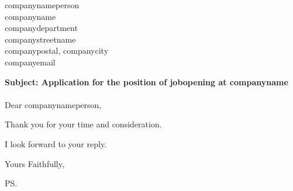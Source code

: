 \documentclass{letter}
\newcommand{\letterdate}{letterdate}
\newcommand{\jobopening}{jobopening}
\newcommand{\companynameperson}{companynameperson}
\newcommand{\companyname}{companyname}
\newcommand{\companydepartment}{companydepartment}
\newcommand{\companystreet}{companystreetname}
\newcommand{\companypostal}{companypostal}
\newcommand{\companycity}{companycity}
\newcommand{\companyemail}{companyemail}
\begin{document}
\begin{letter}{\companynameperson \\ \companyname \\ \companydepartment \\ \companystreet \\ \companypostal, \companycity \\ \companyemail}


	\opening{
		{\bf Subject: Application for the position of {\jobopening} at \companyname} \\ ~ \\
	          Dear \companynameperson,
	}

%	

	Thank you for your time and consideration.

	I look forward to your reply.

	\closing{Yours Faithfully,}

	\ps


\end{letter}
\end{document}
